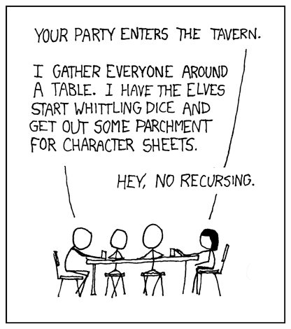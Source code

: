 \documentclass[
  final,
  a4paper,              %
  style=screen,
  twoside,
  nexus,                %
  lnum,                 %
]{tubsartcl}
\begin{document}
		\vfill
		\begin{center}
			\includegraphics[totalheight=10cm]{bilder/XKCD/tabletop_roleplaying}
		\end{center}
		\vfill
\end{document}
